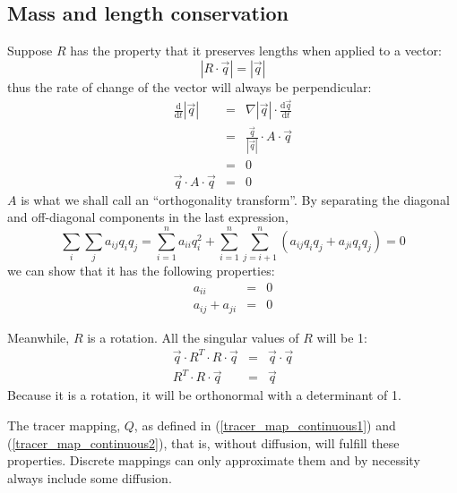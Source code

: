 \documentclass[11pt]{article}
\begin{document}
\subsection{Mass and length conservation}

Suppose $R$ has the property that it preserves lengths when applied to
a vector:
\begin{equation}
|R\cdot \vec q| = |\vec q|
\label{length_preservation}
\end{equation}
thus the rate of change of the vector will always be perpendicular:
\begin{eqnarray}
\frac{\mathrm d}{\mathrm d t}|\vec q| & = & 
	\nabla |\vec q| \cdot \frac{\mathrm d \vec q}{\mathrm d t} \\
	&=& \frac{\vec q}{|\vec q|} \cdot A \cdot \vec q \\
	&=& 0 \\
	\vec q \cdot A \cdot \vec q & = & 0 
\end{eqnarray}
$A$ is what we shall call an ``orthogonality transform''.
By separating the diagonal and off-diagonal components in the last expression,
\begin{equation}
\sum_i \sum_j a_{ij} q_i q_j = \sum_{i=1}^n a_{ii}q_i^2 + \sum_{i=1}^n \sum_{j=i+1}^n (a_{ij} q_i q_j + a_{ji} q_i q_j) = 0
\end{equation}
we can show that it has the following
properties:
\begin{eqnarray}
a_{ii} & = & 0 \\
a_{ij}+a_{ji} & = & 0
\end{eqnarray}

Meanwhile, $R$ is a rotation.  All the singular values of $R$ will be 1:
\begin{eqnarray}
\vec q \cdot R^T \cdot R \cdot \vec q & = & \vec q \cdot \vec q\\
R^T \cdot R \cdot \vec q & = & \vec q
\end{eqnarray}
Because it is a rotation, it will be orthonormal with a determinant of 1.

The tracer mapping, $Q$, as defined in 
(\ref{tracer_map_continuous1}) and (\ref{tracer_map_continuous2}),
that is, without diffusion, will fulfill these properties.  Discrete mappings
can only approximate them and by necessity always include some diffusion.
\end{document}
